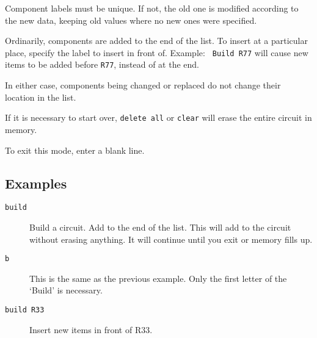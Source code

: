 Component labels must be unique.  If not, the old one is modified according
to the new data, keeping old values where no new ones were specified.

Ordinarily, components are added to the end of the list.  To insert at a
particular place, specify the label to insert in front of.  Example: {\tt
Build R77} will cause new items to be added before {\tt R77}, instead of at
the end.

In either case, components being changed or replaced do not change their
location in the list.

If it is necessary to start over, {\tt delete all} or {\tt clear} will erase
the entire circuit in memory.

To exit this mode, enter a blank line.
\subsection{Examples}

\begin{description}

\item[{\tt build}] Build a circuit.  Add to the end of the list.  This will
add to the circuit without erasing anything.  It will continue until you
exit or memory fills up.

\item[{\tt b}] This is the same as the previous example.  Only the first
letter of the `Build' is necessary.

\item[{\tt build R33}]	Insert new items in front of R33.

\end{description}
